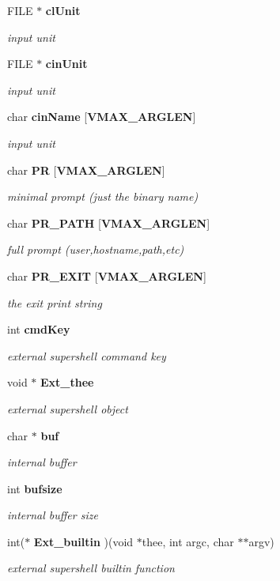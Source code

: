 \begin{DoxyCompactItemize}
F\-I\-L\-E $\ast$ {\bf cl\-Unit}
\begin{DoxyCompactList}\small\item\em input unit \end{DoxyCompactList}\item 
F\-I\-L\-E $\ast$ {\bf cin\-Unit}
\begin{DoxyCompactList}\small\item\em input unit \end{DoxyCompactList}\item 
char {\bf cin\-Name} [{\bf V\-M\-A\-X\-\_\-\-A\-R\-G\-L\-E\-N}]
\begin{DoxyCompactList}\small\item\em input unit \end{DoxyCompactList}\item 
char {\bf P\-R} [{\bf V\-M\-A\-X\-\_\-\-A\-R\-G\-L\-E\-N}]
\begin{DoxyCompactList}\small\item\em minimal prompt (just the binary name) \end{DoxyCompactList}\item 
char {\bf P\-R\-\_\-\-P\-A\-T\-H} [{\bf V\-M\-A\-X\-\_\-\-A\-R\-G\-L\-E\-N}]
\begin{DoxyCompactList}\small\item\em full prompt (user,hostname,path,etc) \end{DoxyCompactList}\item 
char {\bf P\-R\-\_\-\-E\-X\-I\-T} [{\bf V\-M\-A\-X\-\_\-\-A\-R\-G\-L\-E\-N}]
\begin{DoxyCompactList}\small\item\em the exit print string \end{DoxyCompactList}\item 
int {\bf cmd\-Key}
\begin{DoxyCompactList}\small\item\em external supershell command key \end{DoxyCompactList}\item 
void $\ast$ {\bf Ext\-\_\-thee}
\begin{DoxyCompactList}\small\item\em external supershell object \end{DoxyCompactList}\item 
char $\ast$ {\bf buf}
\begin{DoxyCompactList}\small\item\em internal buffer \end{DoxyCompactList}\item 
int {\bf bufsize}
\begin{DoxyCompactList}\small\item\em internal buffer size \end{DoxyCompactList}\item 
int($\ast$ {\bf Ext\-\_\-builtin} )(void $\ast$thee, int argc, char $\ast$$\ast$argv)
\begin{DoxyCompactList}\small\item\em external supershell builtin function \end{DoxyCompactList}\end{DoxyCompactItemize}


